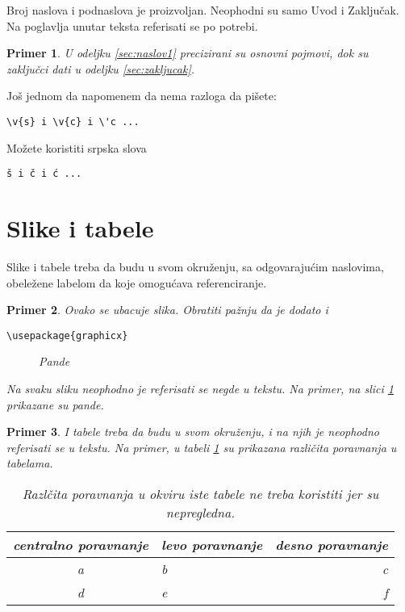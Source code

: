 \documentclass[a4paper]{article}
\newtheorem{primer}{Primer}[section]
\begin{document}
Broj naslova i podnaslova je proizvoljan. Neophodni su samo Uvod i Zaključak. Na poglavlja unutar teksta referisati se po potrebi. 
\begin{primer}
U odeljku \ref{sec:naslov1} precizirani su osnovni pojmovi, dok su zaključci dati u odeljku \ref{sec:zakljucak}.
\end{primer}

Još jednom da napomenem da nema razloga da pišete:
\begin{verbatim}
\v{s} i \v{c} i \'c ...
\end{verbatim}
Možete koristiti srpska slova
\begin{verbatim}
š i č i ć ... 
\end{verbatim}



\section{Slike i tabele}
\label{slike_i_tabele}

Slike i tabele treba da budu u svom okruženju, sa odgovarajućim naslovima, obeležene labelom da koje omogućava referenciranje. 

\begin{primer} Ovako se ubacuje slika. Obratiti pažnju da je dodato i 
\begin{verbatim}
\usepackage{graphicx}
\end{verbatim}

\begin{figure}[h!]
\begin{center}
\end{center}
\caption{Pande}
\label{fig:pande}
\end{figure}

Na svaku sliku neophodno je referisati se negde u tekstu. Na primer, na slici \ref{fig:pande} prikazane su pande. 
\end{primer}

\begin{primer} I tabele treba da budu u svom okruženju, i na njih je neophodno referisati se u tekstu. Na primer, u tabeli \ref{tab:tabela1} su prikazana različita poravnanja u tabelama.

\begin{table}[h!]
\begin{center}
\caption{Razlčita poravnanja u okviru iste tabele ne treba koristiti jer su nepregledna.}
\begin{tabular}{|c|l|r|} \hline
centralno poravnanje& levo poravnanje& desno poravnanje\\ \hline
a &b&c\\ \hline
d &e&f\\ \hline
\end{tabular}
\label{tab:tabela1}
\end{center}
\end{table}

\end{primer}
\end{document}
